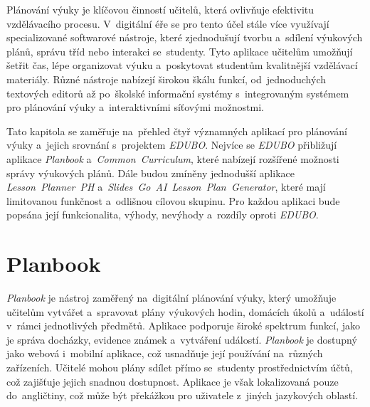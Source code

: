 \documentclass[male,czech,api_bc]{kitheses}
\begin{document}
Plánování výuky je klíčovou činností učitelů, která ovlivňuje efektivitu vzdělávacího procesu. V~digitální éře se pro tento účel stále více využívají specializované softwarové nástroje, které zjednodušují tvorbu a~sdílení výukových plánů, správu tříd nebo interakci se~studenty. Tyto aplikace učitelům umožňují šetřit čas, lépe organizovat výuku a~poskytovat studentům kvalitnější vzdělávací materiály. Různé nástroje nabízejí širokou škálu funkcí, od~jednoduchých textových editorů až po~školské informační systémy s~integrovaným systémem pro plánování výuky a~interaktivními síťovými možnostmi.

Tato kapitola se zaměřuje na~přehled čtyř významných aplikací pro plánování výuky a~jejich srovnání s~projektem \textit{EDUBO}. Nejvíce se \textit{EDUBO} přibližují aplikace \textit{Planbook} a~\textit{Common~Curriculum}, které nabízejí rozšířené možnosti správy výukových plánů. Dále budou zmíněny jednodušší aplikace \textit{Lesson~Planner~PH} a~\textit{Slides~Go~AI~Lesson~Plan~Generator}, které mají limitovanou funkčnost a~odlišnou cílovou skupinu. Pro každou aplikaci bude popsána její funkcionalita, výhody, nevýhody a~rozdíly oproti \textit{EDUBO}.

\section{Planbook}

\textit{Planbook} je nástroj zaměřený na~digitální plánování výuky, který umožňuje učitelům vytvářet a~spravovat plány výukových hodin, domácích úkolů a~událostí v~rámci jednotlivých předmětů. Aplikace podporuje široké spektrum funkcí, jako je správa docházky, evidence známek a~vytváření událostí. \textit{Planbook} je dostupný jako webová i~mobilní aplikace, což usnadňuje její používání na~různých zařízeních. Učitelé mohou plány sdílet přímo se~studenty prostřednictvím účtů, což zajišťuje jejich snadnou dostupnost. Aplikace je však lokalizovaná pouze do~angličtiny, což může být překážkou pro uživatele z~jiných jazykových oblastí.
\end{document}
